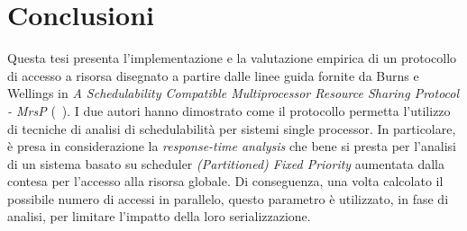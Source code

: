 \chapter{Conclusioni}
\label{sec:conclusione}

Questa tesi presenta l'implementazione e la valutazione empirica di un protocollo di accesso a risorsa disegnato a partire dalle linee guida fornite da Burns e Wellings in \textit{A Schedulability Compatible Multiprocessor Resource Sharing Protocol - MrsP} (~\cite{Burns:2009:RSP:1643588}). I due autori hanno dimostrato come il protocollo permetta l'utilizzo di tecniche di analisi di schedulabilità per sistemi single processor. In particolare, è presa in considerazione la \textit{response-time analysis} che bene si presta per l'analisi di un sistema basato su scheduler \textit{(Partitioned) Fixed Priority} aumentata dalla contesa per l'accesso alla risorsa globale. Di conseguenza, una volta calcolato il possibile numero di accessi in parallelo, questo parametro è utilizzato, in fase di analisi, per limitare l'impatto della loro serializzazione.\\

